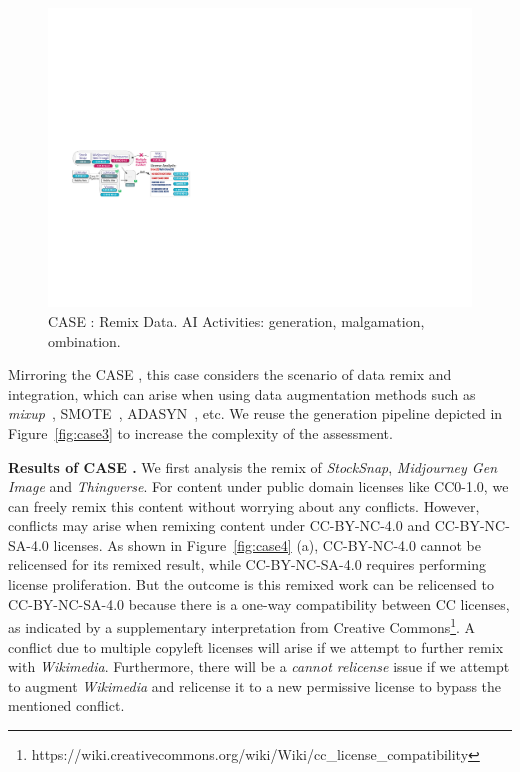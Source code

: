 \begin{figure}[h]
    \centering
    \includegraphics[width=\linewidth]{fig/case5.pdf}
    \caption{CASE : Remix Data. AI Activities: generation, malgamation, ombination.}
    \Description{}
    \label{fig:case5}
\end{figure}

Mirroring the CASE , this case considers the scenario of data remix and integration, which can arise when using data augmentation methods such as \textit{mixup}~\cite{zhang2018mixup}, SMOTE~\cite{chawla2002smote}, ADASYN~\cite{he2008adasyn}, etc.
We reuse the generation pipeline depicted in Figure~\ref{fig:case3} to increase the complexity of the assessment.

\textbf{Results of CASE .}
We first analysis the remix of \textit{StockSnap}, \textit{Midjourney Gen Image} and \textit{Thingverse}.
For content under public domain licenses like CC0-1.0, we can freely remix this content without worrying about any conflicts.
However, conflicts may arise when remixing content under CC-BY-NC-4.0 and CC-BY-NC-SA-4.0 licenses.
As shown in Figure~\ref{fig:case4} (a), CC-BY-NC-4.0 cannot be relicensed for its remixed result, while CC-BY-NC-SA-4.0 requires performing license proliferation.
But the outcome is this remixed work can be relicensed to CC-BY-NC-SA-4.0 because there is a one-way compatibility between CC licenses, as indicated by a supplementary interpretation from Creative Commons\footnote{https://wiki.creativecommons.org/wiki/Wiki/cc\_license\_compatibility}.
A conflict due to multiple copyleft licenses will arise if we attempt to further remix with \textit{Wikimedia}.
Furthermore, there will be a \textit{cannot relicense} issue if we attempt to augment \textit{Wikimedia} and relicense it to a new permissive license to bypass the mentioned conflict.

